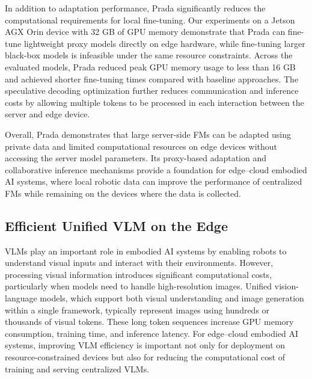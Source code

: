 \documentclass[11pt]{article}
\begin{document}
\begin{table}[t]
\centering
\caption{MMLU accuracy (\%) of Prada and baseline adaptation methods on selected Llama models. Prada uses Llama2-7B as the local proxy model.}
\label{tab:prada_results}
\end{table}

In addition to adaptation performance, Prada significantly reduces the computational requirements for local fine-tuning. Our experiments on a Jetson AGX Orin device with 32 GB of GPU memory demonstrate that Prada can fine-tune lightweight proxy models directly on edge hardware, while fine-tuning larger black-box models is infeasible under the same resource constraints. Across the evaluated models, Prada reduced peak GPU memory usage to less than 16 GB and achieved shorter fine-tuning times compared with baseline approaches. The speculative decoding optimization further reduces communication and inference costs by allowing multiple tokens to be processed in each interaction between the server and edge device.

Overall, Prada demonstrates that large server-side FMs can be adapted using private data and limited computational resources on edge devices without accessing the server model parameters. Its proxy-based adaptation and collaborative inference mechanisms provide a foundation for edge--cloud embodied AI systems, where local robotic data can improve the performance of centralized FMs while remaining on the devices where the data is collected.

\subsection{Efficient Unified VLM on the Edge}
\label{subsec:unicompress}

VLMs play an important role in embodied AI systems by enabling robots to understand visual inputs and interact with their environments. However, processing visual information introduces significant computational costs, particularly when models need to handle high-resolution images. Unified vision-language models, which support both visual understanding and image generation within a single framework, typically represent images using hundreds or thousands of visual tokens. These long token sequences increase GPU memory consumption, training time, and inference latency. For edge--cloud embodied AI systems, improving VLM efficiency is important not only for deployment on resource-constrained devices but also for reducing the computational cost of training and serving centralized VLMs.
\end{document}
